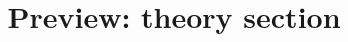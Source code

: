\documentclass[conference]{IEEEtran}
\begin{document}
\title{Preview: theory section}\author{}\maketitle
\newcommand{\secresults}{}

\end{document}

